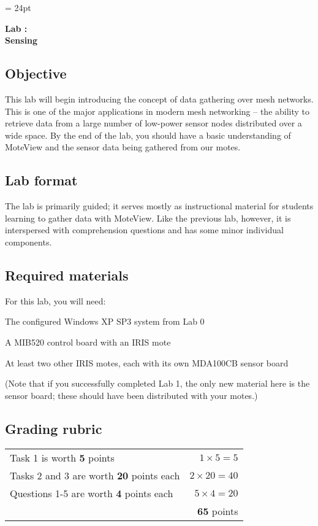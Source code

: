 \documentclass{article}
\begin{document}
\chead{\textcolor{Gray}{CSSE491 -- Mesh Networking Lab Assignment}}
\headsep = 24pt

\begin{center}
{ \large
\textbf{Lab \labnumber: \longproductname} \\
\textbf{Sensing}
}
\end{center}

\subsection*{Objective}
This lab will begin introducing the concept of data gathering over mesh networks. This is one of the major applications in modern mesh networking -- the ability to retrieve data from a large number of low-power sensor nodes distributed over a wide space. By the end of the lab, you should have a basic understanding of MoteView and the sensor data being gathered from our motes.

\subsection*{Lab format}
The lab is primarily guided; it serves mostly as instructional material for students learning to gather data with MoteView. Like the previous lab, however, it is interspersed with comprehension questions and has some minor individual components.

\subsection*{Required materials}
For this lab, you will need:

\begin{itemize*}
\item The configured Windows XP SP3 system from Lab 0
\item A MIB520 control board with an IRIS mote
\item At least two other IRIS motes, each with its own MDA100CB sensor board
\end{itemize*}

(Note that if you successfully completed Lab 1, the only new material here is the sensor board; these should have been distributed with your motes.)

\subsection*{Grading rubric}
\begin{tabular}{p{5.5in} r}
Task 1 is worth \textbf{5} points & $1 \times 5 = 5$ \\
Tasks 2 and 3 are worth \textbf{20} points each & $2 \times 20 = 40$ \\
Questions 1-5 are worth \textbf{4} points each & $5 \times 4 = 20$ \\ \hline
& \textbf{65} points
\end{tabular}
\end{document}
